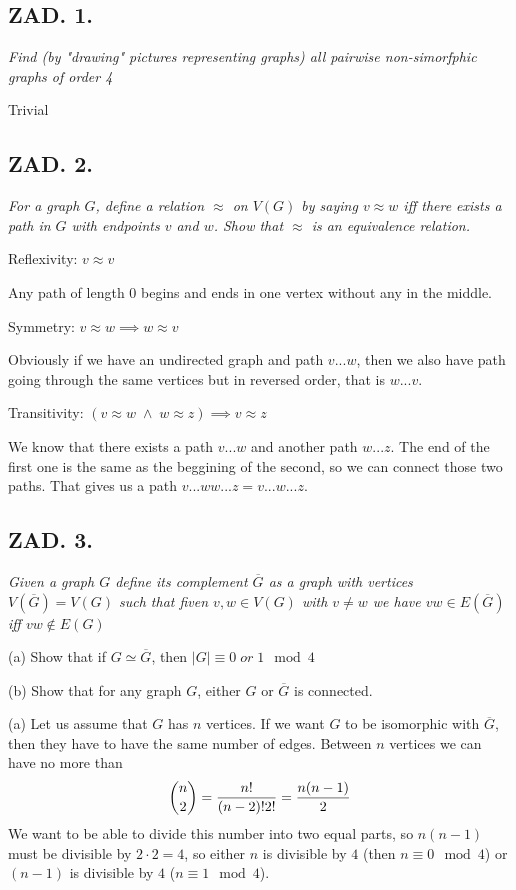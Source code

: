 \documentclass{article}[13pt]
\begin{document}
\subsection*{ZAD. 1.}

\emph{Find (by "drawing" pictures representing graphs) all pairwise non-simorfphic graphs of order 4}
\medskip

Trivial

\subsection*{ZAD. 2.}

\emph{For a graph $G$, define a relation $\approx$ on $V(G)$ by saying $v\approx w$ iff there exists a path in $G$ with endpoints $v$ and $w$. Show that $\approx$ is an equivalence relation.}
\medskip

{\color{acc}Reflexivity:} $v\approx v$ 
\smallskip

Any path of length $0$ begins and ends in one vertex without any in the middle.
\smallskip

{\color{acc}Symmetry:} $v\approx w\implies w\approx v$
\smallskip

Obviously if we have an undirected graph and path $v...w$, then we also have path going through the same vertices but in reversed order, that is $w...v$.
\smallskip

{\color{acc}Transitivity:} $(v\approx w\;\land\;w\approx z)\implies v\approx z$
\smallskip

We know that there exists a path $v...w$ and another path $w...z$. The end of the first one is the same as the beggining of the second, so we can connect those two paths. That gives us a path $v...ww...z=v...w...z$.

\subsection*{ZAD. 3.}

\emph{Given a graph $G$ define its complement $\overline{G}$ as a graph with vertices $V(\overline{G})=V(G)$ such that fiven $v,w\in V(G)$ with $v\neq w$ we have $vw\in E(\overline{G})$ iff $vw\notin E(G)$
}

(a) Show that if $G\simeq\overline{G}$, then $|G|\equiv 0\;or\;1\mod{4}$

(b) Show that for any graph $G$, either $G$ or $\overline{G}$ is connected.
\medskip

{\color{acc}(a)} Let us assume that $G$ has $n$ vertices. If we want $G$ to be isomorphic with $\overline G$, then they have to have the same number of edges. Between $n$ vertices we can have no more than
$${n\choose 2}={n!\over (n-2)!2!}={n(n-1)\over2}$$
We want to be able to divide this number into two equal parts, so $n(n-1)$ must be divisible by $2\cdot2=4$, so either $n$ is divisible by $4$ (then $n\equiv0\mod4$) or $(n-1)$ is divisible by $4$ ($n\equiv1\mod4$).
\medskip
\end{document}
